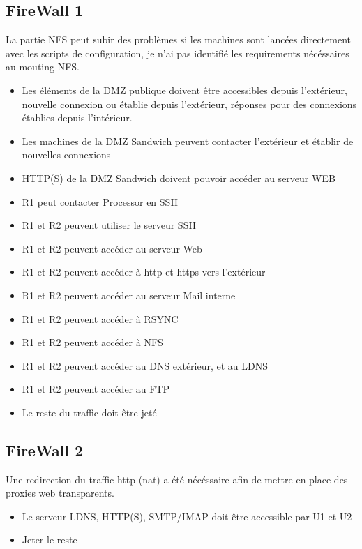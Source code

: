 \documentclass[a4paper,10pt,final,fleqn]{article}
\begin{document}
	\subsection{FireWall 1}

  La partie NFS peut subir des problèmes si les machines sont lancées directement avec les scripts de configuration, je n'ai pas identifié les requirements nécéssaires au mouting NFS.\\

		\begin{itemize}
			\item Les éléments de la DMZ publique doivent être accessibles depuis l'extérieur, nouvelle connexion ou établie depuis l'extérieur, réponses pour des connexions établies depuis l'intérieur.\\
      \item Les machines de la DMZ Sandwich peuvent contacter l'extérieur et établir de nouvelles connexions
      \item HTTP(S) de la DMZ Sandwich doivent pouvoir accéder au serveur WEB
      \item R1 peut contacter Processor en SSH
      \item R1 et R2 peuvent utiliser le serveur SSH
      \item R1 et R2 peuvent accéder au serveur Web
      \item R1 et R2 peuvent accéder à http et https vers l'extérieur
      \item R1 et R2 peuvent accéder au serveur Mail interne
      \item R1 et R2 peuvent accéder à RSYNC
      \item R1 et R2 peuvent accéder à NFS
      \item R1 et R2 peuvent accéder au DNS extérieur, et au LDNS
      \item R1 et R2 peuvent accéder au FTP
      \item Le reste du traffic doit être jeté
		\end{itemize}

  \subsection{FireWall 2}

    Une redirection du traffic http (nat) a été nécéssaire afin de mettre en place des proxies web transparents.\\

    \begin{itemize}
      \item Le serveur LDNS, HTTP(S), SMTP/IMAP doit être accessible par U1 et U2
      \item Jeter le reste
    \end{itemize}
\end{document}
